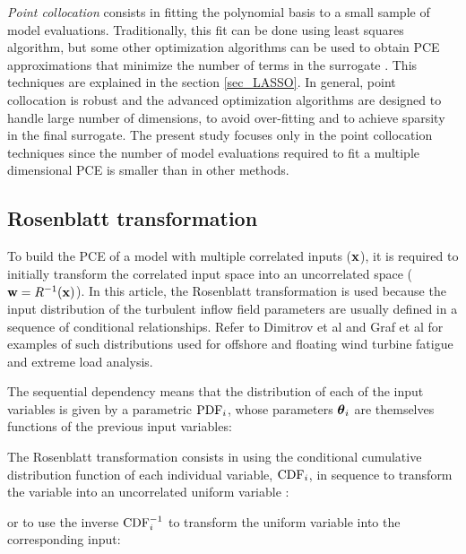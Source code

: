 \documentclass[preprint,12pt]{elsarticle}
\begin{document}
\emph{Point collocation} consists in fitting the polynomial basis to a small sample of model evaluations. Traditionally, this fit can be done using least squares algorithm, but some other optimization algorithms can be used to obtain PCE approximations that minimize the number of  terms in the surrogate \cite{blatman2011adaptive,pedregosa2011scikit,tibshirani1996regression}. This techniques are explained in the section \ref{sec_LASSO}. In general, point collocation is robust and the advanced optimization algorithms are designed to handle large number of dimensions, to avoid over-fitting and to achieve sparsity in the final surrogate. The present study focuses only in the point collocation techniques since the number of model evaluations required to fit a multiple dimensional PCE is smaller \cite{blatman2011adaptive} than in other methods.

\subsection{Rosenblatt transformation}

To build the PCE of a model with multiple correlated inputs ($\mathbf{x}$), it is required to initially transform the correlated input space into an uncorrelated space ($\mathbf{w}=R^{-1}(\mathbf{x})$). In this article, the Rosenblatt transformation is used because the input distribution of the turbulent inflow field parameters are usually defined in a sequence of conditional relationships. Refer to Dimitrov et al \cite{dimitrov2015model} and Graf et al \cite{graf2015high} for examples of such distributions used for offshore and floating wind turbine fatigue and extreme load analysis.

The sequential dependency means that the distribution of each of the input variables is given by a parametric $\mathrm{PDF}_i$, whose parameters $\boldsymbol{\theta}_i$ are themselves functions of the previous input variables:


The Rosenblatt transformation consists in using the conditional cumulative distribution function of each individual variable, $\mathrm{CDF}_i$, in sequence to transform the variable into an uncorrelated uniform variable \cite{rosenblatt1952}:


\noindent or to use the inverse $\mathrm{CDF}^{-1}_i$ to transform the uniform variable into the corresponding input:
\end{document}

